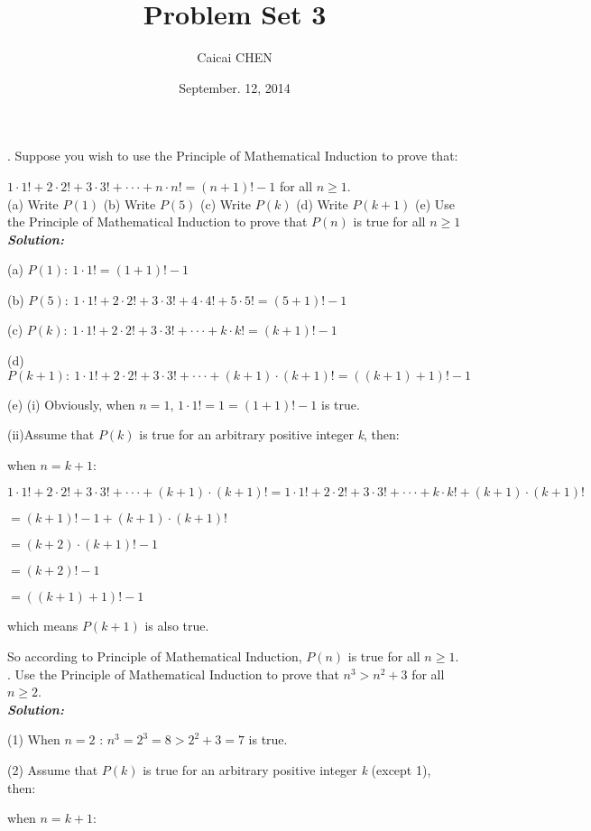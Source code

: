 \documentclass[11pt, oneside]{article}   	%
\title{Problem Set 3}
\author{Caicai CHEN}
\date{September. 12, 2014}							%
\begin{document}
\maketitle

. Suppose you wish to use the Principle of Mathematical Induction to prove that:

$1\cdot 1!+2\cdot 2! + 3\cdot 3!+\cdot\cdot\cdot+n\cdot n!=(n+1)!-1$ for all $n\ge 1$.\\
(a) Write $P(1)$ (b) Write $P(5)$ (c) Write $P(k)$ (d) Write $P(k+1)$ (e) Use the Principle of Mathematical Induction to prove that $P(n)$ is true for all $n\ge 1$\\
\textbf{\emph{Solution:}}

(a) $P(1):\ 1\cdot 1!=(1+1)!-1$

(b) $P(5):\ 1\cdot 1!+2\cdot 2!+3\cdot 3!+4\cdot 4!+5\cdot 5!=(5+1)!-1$

(c) $P(k):\ 1\cdot 1!+2\cdot 2! + 3\cdot 3!+\cdot\cdot\cdot+k\cdot k!=(k+1)!-1$

(d) $P(k+1):\ 1\cdot 1!+2\cdot 2! + 3\cdot 3!+\cdot\cdot\cdot+(k+1)\cdot (k+1)!=((k+1)+1)!-1$

(e) (i) Obviously, when $n=1$,  $1\cdot 1!=1=(1+1)!-1$ is true.

\quad (ii)Assume that $P(k)$ is true for an arbitrary positive integer \emph{k}, then:

when $n=k+1$:

$1\cdot 1!+2\cdot 2! + 3\cdot 3!+\cdot\cdot\cdot+(k+1)\cdot (k+1)!=1\cdot 1!+2\cdot 2! + 3\cdot 3!+\cdot\cdot\cdot+k\cdot k!+(k+1)\cdot (k+1)!$

$=(k+1)!-1+(k+1)\cdot (k+1)!$

$=(k+2)\cdot(k+1)!-1$

$=(k+2)!-1$

$=((k+1)+1)!-1$

which means $P(k+1)$ is also true.

So according to Principle of Mathematical Induction, $P(n)$ is true for all $n\ge 1$.\\

. Use the Principle of Mathematical Induction to prove that $n^{3}>n^{2}+3$ for all $n\ge 2$. \\
\textbf{\emph{Solution:}}

(1) When $n=2$ : $n^{3}=2^{3}=8>2^{2}+3=7$ is true.

(2) Assume that $P(k)$ is true for an arbitrary positive integer \emph{k} (except 1), then:

when $n=k+1$:
\end{document}

